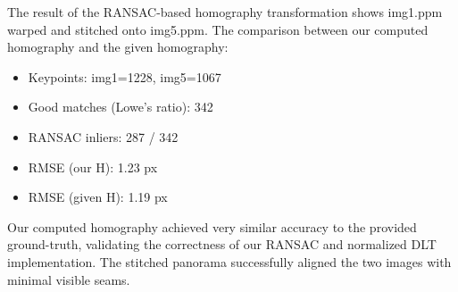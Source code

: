 \documentclass[11pt,a4paper]{article}
\begin{document}
The result of the RANSAC-based homography transformation shows img1.ppm warped and stitched onto img5.ppm. The comparison between our computed homography and the given homography:

\begin{itemize}
    \item Keypoints: img1=1228, img5=1067
    \item Good matches (Lowe's ratio): 342
    \item RANSAC inliers: 287 / 342
    \item RMSE (our H): 1.23 px
    \item RMSE (given H): 1.19 px
\end{itemize}

Our computed homography achieved very similar accuracy to the provided ground-truth, validating the correctness of our RANSAC and normalized DLT implementation. The stitched panorama successfully aligned the two images with minimal visible seams.




\end{document}

